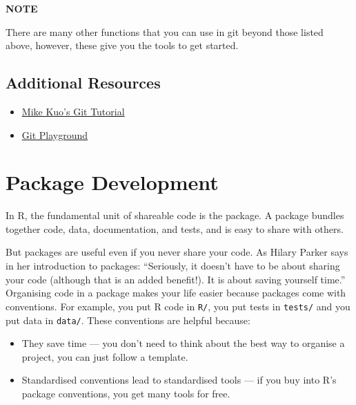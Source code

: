 \documentclass[
]{book}
\providecommand{\tightlist}{%
  \setlength{\itemsep}{0pt}\setlength{\parskip}{0pt}}
\begin{document}
\textbf{NOTE}

There are many other functions that you can use in git beyond those listed above, however, these give you the tools to get started.

\hypertarget{additional-resources}{%
\section{Additional Resources}\label{additional-resources}}

\begin{itemize}
\tightlist
\item
  \href{https://healthbc-my.sharepoint.com/personal/michael_kuo_bccdc_ca/_layouts/15/onedrive.aspx?id=\%2Fpersonal\%2Fmichael\%5Fkuo\%5Fbccdc\%5Fca\%2FDocuments\%2FMicrosoft\%20Teams\%20Chat\%20Files\%2Fversion\%5Fcontrol\%5Ftutorial\%2Ehtml\&parent=\%2Fpersonal\%2Fmichael\%5Fkuo\%5Fbccdc\%5Fca\%2FDocuments\%2FMicrosoft\%20Teams\%20Chat\%20Files\&ga=1}{Mike Kuo's Git Tutorial}\\
\item
  \href{https://learngitbranching.js.org/}{Git Playground}
\end{itemize}

\hypertarget{package-development}{%
\chapter{Package Development}\label{package-development}}

In R, the fundamental unit of shareable code is the package. A package bundles together code, data, documentation, and tests, and is easy to share with others.

But packages are useful even if you never share your code. As Hilary Parker says in her introduction to packages: ``Seriously, it doesn't have to be about sharing your code (although that is an added benefit!). It is about saving yourself time.'' Organising code in a package makes your life easier because packages come with conventions. For example, you put R code in \texttt{R/}, you put tests in \texttt{tests/} and you put data in \texttt{data/}. These conventions are helpful because:

\begin{itemize}
\item
  They save time --- you don't need to think about the best way to organise a project, you can just follow a template.
\item
  Standardised conventions lead to standardised tools --- if you buy into R's package conventions, you get many tools for free.
\end{itemize}
\end{document}
